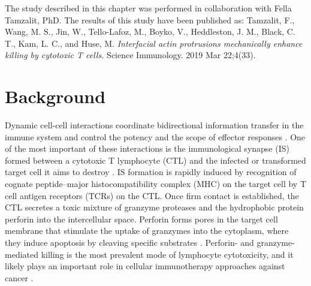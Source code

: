 The study described in this chapter was performed in collaboration with Fella Tamzalit, PhD. The results of this study have been published as: Tamzalit, F., Wang, M. S., Jin, W., Tello-Lafoz, M., Boyko, V., Heddleston, J. M., Black, C. T., Kam, L. C., and Huse, M.  \textit{Interfacial actin protrusions mechanically enhance killing by cytotoxic T cells.} Science Immunology. 2019 Mar 22;4(33).

\section{Background}
Dynamic cell-cell interactions coordinate bidirectional information transfer in the immune system and control the potency and the scope of effector responses \cite{Batista2013}. One of the most important of these interactions is the immunological synapse (IS) formed between a cytotoxic T lymphocyte (CTL) and the infected or transformed target cell it aims to destroy \cite{Dustin2010, Stinchcombe2007}. IS formation is rapidly induced by recognition of cognate peptide–major histocompatibility complex (MHC) on the target cell by T cell antigen receptors (TCRs) on the CTL. Once firm contact is established, the CTL secretes a toxic mixture of granzyme proteases and the hydrophobic protein perforin into the intercellular space. Perforin forms pores in the target cell membrane that stimulate the uptake of granzymes into the cytoplasm, where they induce apoptosis by cleaving specific substrates \cite{Thiery2014}. Perforin- and granzyme- mediated killing is the most prevalent mode of lymphocyte cytotoxicity, and it likely plays an important role in cellular immunotherapy approaches against cancer \cite{Martinez-Lostao2015}.

